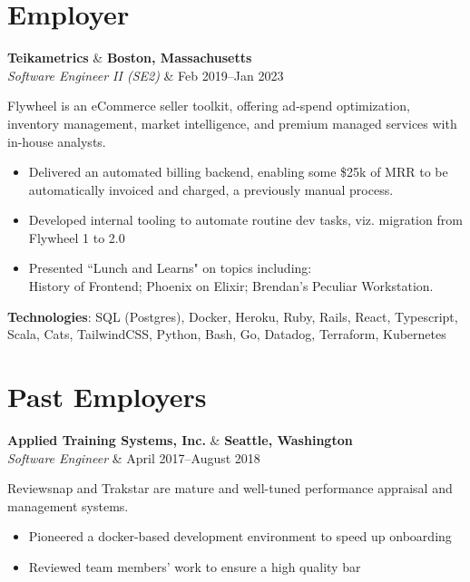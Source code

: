 \documentclass[line,margin]{res}
\newcommand{\role}[4]{
  \begin{tabularx}
    \textbf{#1}   & \hfill \textbf{#2} \\
    \textit{#3}   & \hfill #4          \\
  \end{tabularx}
}
\newcommand{\employerSummary}[1]{
  \begin{small} 
    #1 
  \end{small}
}
\newcommand{\impact}[1]{
    \begin{itemize}
        #1
    \end{itemize}
}
\newcommand{\technologies}[1]{
    \textbf{Technologies}: #1
}
\begin{document}
\begin{resume}
\section{\sc Employer}
  \role
    {Teikametrics}
    {Boston, Massachusetts}
    {Software Engineer II (SE2)}
    {Feb 2019--Jan 2023}
  \employerSummary
    {Flywheel is an eCommerce seller toolkit, offering ad-spend optimization, inventory management,
     market intelligence, and premium managed services with in-house analysts.}
  \impact{
    \item Delivered an automated billing backend, enabling some \$25k of MRR to be automatically invoiced and charged, a previously manual process.
    \item Developed internal tooling to automate routine dev tasks, viz. migration from Flywheel 1 to 2.0
    \item Presented ``Lunch and Learns" on topics including: \\ History of Frontend; Phoenix on Elixir; Brendan's Peculiar Workstation.
  }
  \technologies{
    SQL (Postgres), Docker, Heroku, Ruby, Rails, React, Typescript, Scala, Cats,
    TailwindCSS, Python, Bash, Go, Datadog, Terraform, Kubernetes
  }

\newpage

\section{\sc Past Employers}


    \role
      {Applied Training Systems, Inc.}
      {Seattle, Washington}
      {Software Engineer}
      {April 2017--August 2018}
    \employerSummary
      {Reviewsnap and Trakstar are mature and well-tuned performance appraisal and management systems.}
    \impact{
        \item Pioneered a docker-based development environment to speed up onboarding
        \item Reviewed team members' work to ensure a high quality bar
    }


\end{resume}
\end{document}
